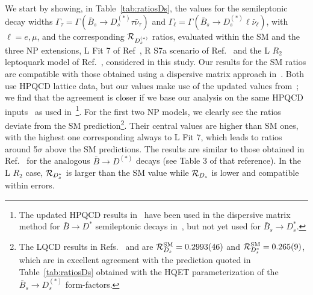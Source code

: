 \documentclass[aps,superscriptaddress,showpacs,nofootinbib,11pt]{revtex4-1}
\begin{document}
We start by showing, in Table~\ref{tab:ratiosDs}, the values for the
 semileptonic decay widths $\Gamma_\tau=\Gamma(\bar B_s\to D^{(*)}_s\tau\bar\nu_\tau)$ 
and   $\Gamma_{\ell}=\Gamma(\bar B_s\to D^{(*)}_s\ell\bar\nu_{\ell})$, with
$\ell=e,\mu$, and the corresponding  ${\cal R}_{D^{(*)}_s}$ ratios,
evaluated within the SM and the three NP extensions,  L Fit 7 of Ref~\cite{Murgui:2019czp}, R S7a scenario of Ref.~\cite{Mandal:2020htr} and the L $R_2$ leptoquark model of  Ref.~\cite{Shi:2019gxi}, considered in this study.  Our results for the SM ratios are compatible with those obtained using a dispersive matrix approach in~\cite{Martinelli:2022xir}. Both use HPQCD lattice data, but our values make use of the updated values from~\cite{Harrison:2023dzh}; we find that the agreement is closer if we base our analysis on the same HPQCD inputs~\cite{McLean:2019qcx,Harrison:2021tol} as used in~\cite{Martinelli:2022xir}\footnote{The updated HPQCD results in~\cite{Harrison:2023dzh} have been used in the dispersive matrix method for $\bar B\to D^*$ semileptonic decays in~\cite{Martinelli:2023fwm}, but not yet used for $\bar B_s\to D_s^*$.}.
For the first two NP models, we clearly see the ratios deviate from the SM prediction\footnote{The LQCD results in Refs.~\cite{McLean:2019qcx} and \cite{Harrison:2023dzh} are ${\cal R}^{\rm SM}_{D_s}=0.2993 (46)$ and ${\cal R}^{\rm SM}_{D_s^*}=0.265(9)$, which are in excellent agreement with the prediction quoted in Table~\ref{tab:ratiosDs} obtained with the HQET parameterization of the $\bar B_s \to D^{(*)}_s$ form-factors.  
}. Their central values are higher than SM ones, with the highest one corresponding always to L Fit 7, which leads to ratios around 5$\sigma$ above the SM predictions.  The results are similar to those obtained in Ref.~\cite{Penalva:2022vxy} for the analogous $\bar B\to D^{(*)}$ decays (see Table 3 of that reference). In the L $R_2$ case, ${\cal R}_{D_s^*}$ is larger than the SM value while ${\cal R}_{D_s}$ is lower and compatible within errors.
\end{document}
